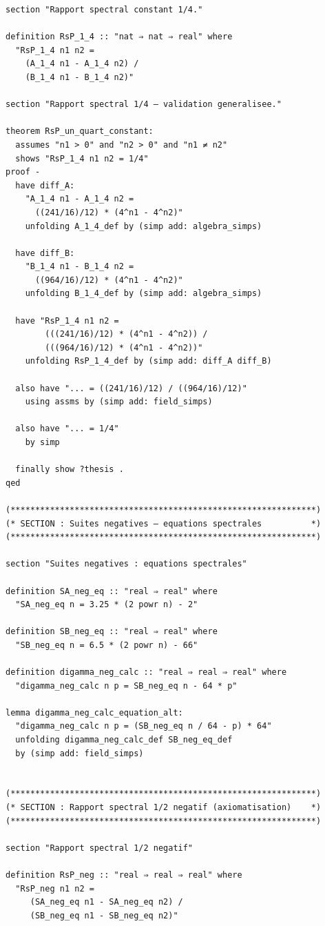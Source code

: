 \documentclass[a4paper,11pt]{article}
\begin{document}
\begin{holcode}[title={\textcolor{white}{Fichier : methode\_spectral.thy -- Partie 3/4}}]
\begin{lstlisting}
section "Rapport spectral constant 1/4."

definition RsP_1_4 :: "nat ⇒ nat ⇒ real" where
  "RsP_1_4 n1 n2 =
    (A_1_4 n1 - A_1_4 n2) /
    (B_1_4 n1 - B_1_4 n2)"

section "Rapport spectral 1/4 – validation generalisee."

theorem RsP_un_quart_constant:
  assumes "n1 > 0" and "n2 > 0" and "n1 ≠ n2"
  shows "RsP_1_4 n1 n2 = 1/4"
proof -
  have diff_A:
    "A_1_4 n1 - A_1_4 n2 =
      ((241/16)/12) * (4^n1 - 4^n2)"
    unfolding A_1_4_def by (simp add: algebra_simps)

  have diff_B:
    "B_1_4 n1 - B_1_4 n2 =
      ((964/16)/12) * (4^n1 - 4^n2)"
    unfolding B_1_4_def by (simp add: algebra_simps)

  have "RsP_1_4 n1 n2 =
        (((241/16)/12) * (4^n1 - 4^n2)) /
        (((964/16)/12) * (4^n1 - 4^n2))"
    unfolding RsP_1_4_def by (simp add: diff_A diff_B)

  also have "... = ((241/16)/12) / ((964/16)/12)"
    using assms by (simp add: field_simps)

  also have "... = 1/4"
    by simp

  finally show ?thesis .
qed

(**************************************************************)
(* SECTION : Suites negatives – equations spectrales          *)
(**************************************************************)

section "Suites negatives : equations spectrales"

definition SA_neg_eq :: "real ⇒ real" where
  "SA_neg_eq n = 3.25 * (2 powr n) - 2"

definition SB_neg_eq :: "real ⇒ real" where
  "SB_neg_eq n = 6.5 * (2 powr n) - 66"

definition digamma_neg_calc :: "real ⇒ real ⇒ real" where
  "digamma_neg_calc n p = SB_neg_eq n - 64 * p"

lemma digamma_neg_calc_equation_alt:
  "digamma_neg_calc n p = (SB_neg_eq n / 64 - p) * 64"
  unfolding digamma_neg_calc_def SB_neg_eq_def
  by (simp add: field_simps)


(**************************************************************)
(* SECTION : Rapport spectral 1/2 negatif (axiomatisation)    *)
(**************************************************************)

section "Rapport spectral 1/2 negatif"

definition RsP_neg :: "real ⇒ real ⇒ real" where
  "RsP_neg n1 n2 =
     (SA_neg_eq n1 - SA_neg_eq n2) /
     (SB_neg_eq n1 - SB_neg_eq n2)"


\end{lstlisting}
\end{holcode}
\end{document}

